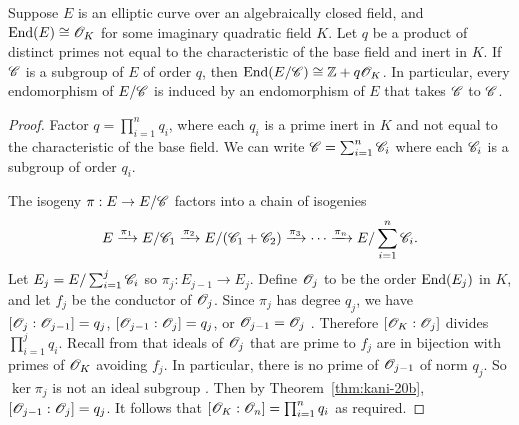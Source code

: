 \documentclass{amsart}
\begin{document}
\begin{lemma}\label{lem:c-end}
  Suppose $E$ is an elliptic curve over an algebraically closed field, and $\operatorname{End}(E) \cong \mathscr{O}_K$ for some imaginary quadratic field $K$. Let $q$ be a product of distinct primes not equal to the characteristic of the base field and inert in $K$. If $\mathscr{C}$ is a subgroup of $E$ of order $q$, then $\operatorname{End}(E/\mathscr{C}) \cong \mathbb{Z} + q\mathscr{O}_K$. In particular, every endomorphism of $E/\mathscr{C}$ is induced by an endomorphism of $E$ that takes $\mathscr{C}$ to $\mathscr{C}$.
\end{lemma}
\begin{proof}
  Factor $q = \prod_{i=1}^n q_i$, where each $q_i$ is a prime inert in $K$ and not equal to the characteristic of the base field. We can write $\mathscr{C} = \sum_{i=1}^n \mathscr{C}_i$ where each $\mathscr{C}_i$ is a subgroup of order $q_i$.

  The isogeny $\pi: E \to E/\mathscr{C}$ factors into a chain of isogenies
  \[
    E
    \xrightarrow{\pi_1}
    E/\mathscr{C}_1
    \xrightarrow{\pi_2}
    E/(\mathscr{C}_1 + \mathscr{C}_2)
    \xrightarrow{\pi_3}
    \cdots
    \xrightarrow{\pi_n}
    E/\sum_{i=1}^n\mathscr{C}_i.
  \]
  Let $E_j = E/\sum_{i=1}^j\mathscr{C}_i$ so $\pi_j: E_{j-1} \to E_j$. Define $\mathscr{O}_j$ to be the order $\operatorname{End}(E_j)$ in $K$, and let $f_j$ be the conductor of $\mathscr{O}_j$. Since $\pi_j$ has degree $q_j$, we have $[\mathscr{O}_j : \mathscr{O}_{j-1}] = q_j$, $[\mathscr{O}_{j-1} : \mathscr{O}_j] = q_j$, or $\mathscr{O}_{j-1} = \mathscr{O}_j$ \cite[Prop.~5]{kohel1996endomorphism}. Therefore $[\mathscr{O}_K : \mathscr{O}_j]$ divides $\prod_{i=1}^{j}q_i$. Recall from \cite[Prop.~7.20]{cox2011primes} that ideals of $\mathscr{O}_j$ that are prime to $f_j$ are in bijection with primes of $\mathscr{O}_K$ avoiding $f_j$. In particular, there is no prime of $\mathscr{O}_{j-1}$ of norm $q_j$. So $\ker\pi_j$ is not an ideal subgroup \cite[Prop.~23]{kani2011products}. Then by Theorem~\ref{thm:kani-20b}, $[\mathscr{O}_{j-1} : \mathscr{O}_j] = q_j$. It follows that $[\mathscr{O}_K : \mathscr{O}_n] = \prod_{i=1}^n q_i$ as required.
\end{proof}
\end{document}
